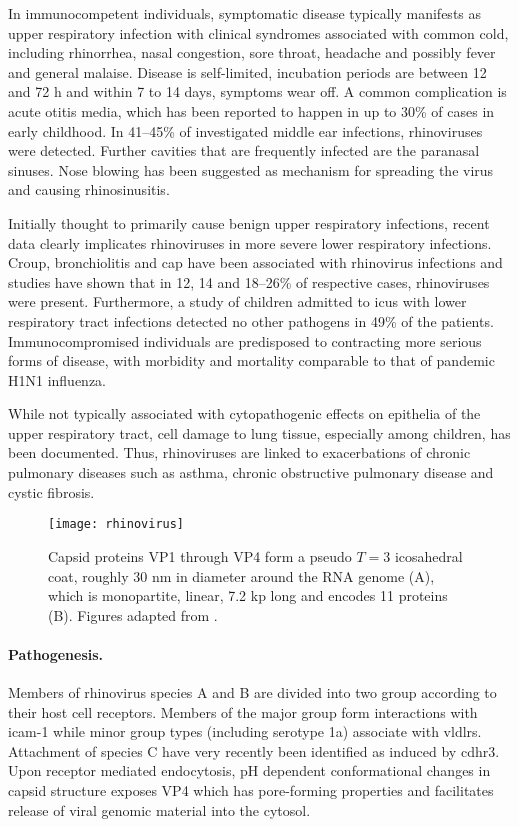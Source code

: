 In immunocompetent individuals, symptomatic disease typically manifests as upper respiratory infection with clinical syndromes associated with common cold, including rhinorrhea, nasal congestion, sore throat, headache and possibly fever and general malaise. Disease is self-limited, incubation periods are between 12 and 72 h and within 7 to 14 days, symptoms wear off. A common complication is acute otitis media, which has been reported to happen in up to 30\% of cases in early childhood. In 41--45\% of investigated middle ear infections, rhinoviruses were detected. Further cavities that are frequently infected are the paranasal sinuses. Nose blowing has been suggested as mechanism for spreading the virus and causing rhinosinusitis.

Initially thought to primarily cause benign upper respiratory infections,  recent data clearly implicates rhinoviruses in more severe lower respiratory infections. Croup, bronchiolitis and \gls{cap} have been associated with rhinovirus infections and studies have shown that in 12, 14 and 18--26\% of respective cases, rhinoviruses were present. Furthermore, a study of children admitted to \glspl{icu} with lower respiratory tract infections detected no other pathogens in 49\% of the patients. Immunocompromised individuals are predisposed to contracting more serious forms of disease, with morbidity and mortality comparable to that of pandemic H1N1 influenza.

While not typically associated with cytopathogenic effects on epithelia of the upper respiratory tract, cell damage to lung tissue, especially among children, has been documented. Thus, rhinoviruses are linked to exacerbations of chronic pulmonary diseases such as asthma, chronic obstructive pulmonary disease and cystic fibrosis.

\begin{figure}
  \centering
  \texttt{[image: rhinovirus]}
  \caption[Capsid structure and genome of rhinoviruses.]{Capsid proteins VP1 through VP4 form a pseudo $T=3$ icosahedral coat, roughly 30 nm in diameter around the RNA genome (A), which is monopartite, linear, 7.2 kp long and encodes 11 proteins (B). Figures adapted from \cite{Hulo2011}.}
  \label{fig:rhinovirus}
\end{figure}

\paragraph{Pathogenesis.}
Members of rhinovirus species A and B are divided into two group according to their host cell receptors. Members of the major group form interactions with \gls{icam-1} while minor group types (including serotype 1a) associate with \glspl{vldlr}. Attachment of species C have very recently been identified as induced by \gls{cdhr3}. Upon receptor mediated endocytosis, pH dependent conformational changes in capsid structure exposes VP4 which has pore-forming properties and facilitates release of viral genomic material into the cytosol.

